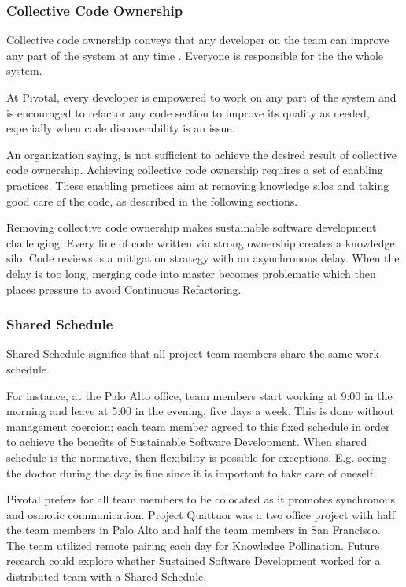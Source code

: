 \begin{table}[]
\subsubsection{Collective Code Ownership}
Collective code ownership conveys that any developer on the team can improve any part of the system at any time \cite{ExtremeProgramming2004}. Everyone is responsible for the the whole system. 

At Pivotal, every developer is empowered to work on any part of the system and is encouraged to refactor any code section to improve its quality as needed, especially when code discoverability is an issue.

An organization saying,  is not sufficient to achieve the desired result of collective code ownership. Achieving collective code ownership requires a set of enabling practices. These enabling practices aim at removing knowledge silos and taking good care of the code, as described in the following sections.

Removing collective code ownership makes sustainable software development challenging. Every line of code written via strong ownership creates a knowledge silo. Code reviews is a mitigation strategy with an asynchronous delay. When the delay is too long, merging code into master becomes problematic which then places pressure to avoid Continuous Refactoring.  

\subsubsection{Shared Schedule}

Shared Schedule signifies that all project team members share the same work schedule. 

For instance, at the Palo Alto office, team members start working at 9:00 in the morning and leave at 5:00 in the evening, five days a week. This is done without management coercion; each team member agreed to this fixed schedule in order to achieve the benefits of Sustainable Software Development. When shared schedule is the normative, then flexibility is possible for exceptions. E.g. seeing the doctor during the day is fine since it is important to take care of oneself.

Pivotal prefers for all team members to be colocated as it promotes synchronous and osmotic communication. Project Quattuor was a two office project with half the team members in Palo Alto and half the team members in San Francisco. The team utilized remote pairing each day for Knowledge Pollination. Future research could explore whether Sustained Software Development worked for a distributed team with a Shared Schedule.


\end{table}
